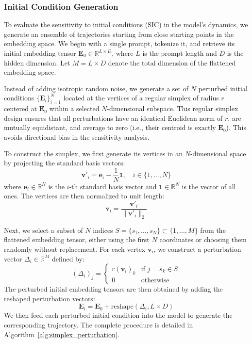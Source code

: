 \subsubsection{Initial Condition Generation}
\label{subsec:init_cond_gen}

To evaluate the sensitivity to initial conditions (SIC) in the model's dynamics, we generate an ensemble of trajectories starting from close starting points in the embedding space. We begin with a single prompt, tokenize it, and retrieve its initial embedding tensor $\mathbf{E}_0 \in \mathbb{R}^{L \times D}$, where $L$ is the prompt length and $D$ is the hidden dimension. Let $M = L \times D$ denote the total dimension of the flattened embedding space. 

Instead of adding isotropic random noise, we generate a set of $N$ perturbed initial conditions $\{\mathbf{E}_i\}_{i=1}^N$ located at the vertices of a regular simplex of radius $r$ centered at $\mathbf{E}_0$ within a selected $N$-dimensional subspace. This regular simplex design ensures that all perturbations have an identical Euclidean norm of $r$, are mutually equidistant, and average to zero (i.e., their centroid is exactly $\mathbf{E}_0$). This avoids directional bias in the sensitivity analysis.

To construct the simplex, we first generate its vertices in an $N$-dimensional space by projecting the standard basis vectors:
\begin{equation}
\mathbf{v}'_i = \mathbf{e}_i - \frac{1}{N}\mathbf{1}, \quad i \in \{1, \dots, N\}
\end{equation}
where $\mathbf{e}_i \in \mathbb{R}^N$ is the $i$-th standard basis vector and $\mathbf{1} \in \mathbb{R}^N$ is the vector of all ones. The vertices are then normalized to unit length:
\begin{equation}
\mathbf{v}_i = \frac{\mathbf{v}'_i}{\|\mathbf{v}'_i\|_2}
\end{equation}

Next, we select a subset of $N$ indices $S = \{s_1, \dots, s_N\} \subset \{1, \dots, M\}$ from the flattened embedding tensor, either using the first $N$ coordinates or choosing them randomly without replacement. For each vertex $\mathbf{v}_i$, we construct a perturbation vector $\Delta_i \in \mathbb{R}^M$ defined by:
\begin{equation}
(\Delta_i)_j = \begin{cases} 
r (\mathbf{v}_i)_k & \text{if } j = s_k \in S \\
0 & \text{otherwise}
\end{cases}
\end{equation}
The perturbed initial embedding tensors are then obtained by adding the reshaped perturbation vectors:
\begin{equation}
\mathbf{E}_i = \mathbf{E}_0 + \text{reshape}(\Delta_i, L \times D)
\end{equation}
We then feed each perturbed initial condition into the model to generate the corresponding trajectory. The complete procedure is detailed in Algorithm~\ref{alg:simplex_perturbation}.

